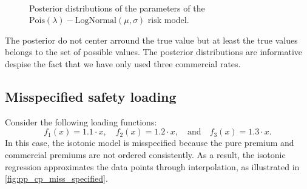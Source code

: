 \documentclass[10pt]{article}
\begin{document}
\begin{figure}[!ht]
  \begin{center}
    \\
    \caption{Posterior distributions of the parameters of the $\text{Pois}(\lambda)-\text{LogNormal}(\mu , \sigma)$ risk model.}
    \label{fig:posterior_commercial_premium_w_reg}
  \end{center}
\end{figure}
The posterior do not center arround the true value but at least the true values belongs to the set of possible values. The posterior distributions are informative despise the fact that we have only used three commercial rates. 

\subsection{Misspecified safety loading} \label{ssec:miss_specfifed_safety_loading}
Consider the following loading functions:  
$$
f_1(x) = 1.1 \cdot x, \quad f_2(x) = 1.2 \cdot x, \quad \text{and} \quad f_3(x) = 1.3 \cdot x.
$$
In this case, the isotonic model is misspecified because the pure premium and commercial premiums are not ordered consistently. As a result, the isotonic regression approximates the data points through interpolation, as illustrated in \cref{fig:pp_cp_miss_specified}.
\end{document}
